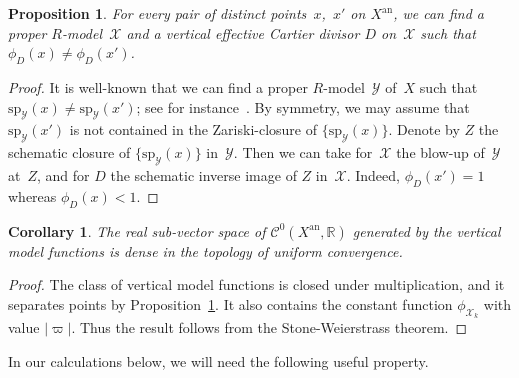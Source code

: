 \documentclass[JEP,XML,SOM,Unicode,NoFloatCountersInSection]{cedram}
\let\mathcal\mathscr
\newtheorem{prop}[equation]{Proposition}
\newtheorem{cor}[equation]{Corollary}
\theoremstyle{definition}
\numberwithin{equation}{subsection}
\newcommand{\R}{\ensuremath{\mathbb{R}}}
\newcommand{\cX}{\ensuremath{\mathscr{X}}}
\newcommand{\cY}{\ensuremath{\mathscr{Y}}}
\newcommand{\an}{\mathrm{an}}
\newcommand{\spe}{\mathrm{sp}}
\let\unif\varpi
\begin{document}
\begin{prop}\label{prop:test}
For every pair of distinct points~$x$,~$x'$ on $X^{\an}$, we can find a proper $R$\nobreakdash-model~$\cX$ and a vertical effective Cartier divisor $D$ on~$\cX$ such that $\phi_D(x)\neq \phi_D(x')$.
\end{prop}
\begin{proof}
It is well-known that we can find a proper $R$\nobreakdash-model~$\cY$ of~$X$ such that $\spe_{\cY}(x)\neq \spe_{\cY}(x')$; see for instance~\cite[2.3.2]{MuNi}.
By symmetry, we may assume that $\spe_{\cY}(x')$ is not contained in the Zariski-closure of $\{\spe_{\cY}(x)\}$. Denote by $Z$ the schematic closure of $\{\spe_{\cY}(x)\}$ in~$\cY$. Then we can take for~$\cX$ the blow-up of~$\cY$ at~$Z$, and for $D$ the schematic inverse image of $Z$ in~$\cX$. Indeed, $\phi_D(x')=1$ whereas $\phi_D(x)<1$.
\end{proof}
\begin{cor}\label{cor:stone}
The real sub-vector space of $\mathcal{C}^0(X^{\an},\R)$ generated by the vertical model functions
is dense in the topology of uniform convergence.
\end{cor}
\begin{proof}
The class of vertical model functions is closed under multiplication, and it separates points by
Proposition~\ref{prop:test}. It also contains the constant function $\phi_{\cX_k}$ with value $|\unif|$.
Thus the result follows from the Stone-Weierstrass theorem.
\end{proof}

In our calculations below, we will need the following useful property.
\end{document}
